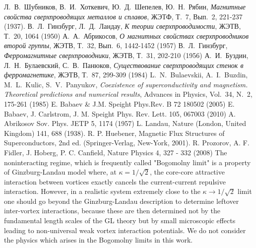 \def\bibname{СПИСОК ИСПОЛЬЗОВАННЫХ ИСТОЧНИКОВ}
\begin{thebibliography}{99}
	\newcommand{\tabfix}{\hspace*{1.25cm}}
	 Л.~В.~Шубников, В.~И.~Хоткевич, Ю.~Д.~Шепелев, 
        Ю.~Н.~Рябин, \textit{Магнитные свойства сверхпроводящих металлов и 
        сплавов}, ЖЭТФ, Т.~7, Вып.~2, 221-237 (1937).
     В.~Л.~Гинзбург, Л.~Д.~Ландау, \textit{К теории 
        сверхпроводимости}, ЖЭТВ, Т.~20, 1064 (1950)
     А.~А.~Абрикосов, \textit{О магнитных свойствах 
        сверхпроводников второй группы}, ЖЭТВ, Т.~32, Вып.~6, 1442-1452 (1957)
     В.~Л.~Гинзбург, \textit{Ферромагнитные 
        сверхпроводники}, ЖЭТВ, Т.~31, 202-210 (1956)
     А.~И.~Буздин, Л.~Н.~Булаевский, С.~В.~Панюков, 
        \textit{Существование сверхпроводящих стенок в ферромагнетике}, 
        ЖЭТВ, Т.~87, 299-309 (1984)
     L.~N.~Bulaevskii, A.~I.~Buzdin, M.~L.~Kulic, 
        S.~V.~Panyukov, \textit{Coexistence of superconductivity and 
        magnetism. Theoretical predictions and numerical results}, Advances in 
        Physics, Vol.~34, N.~2, 175-261 (1985)
     E. Babaev \& J.M. Speight Phys.Rev. B 72 180502 (2005)
     E. Babaev, J. Carlstrom, J. M. Speight Phys. Rev. Lett. 
        105, 067003 (2010)
     A. Abrikosov Sov. Phys. JETP 5, 1174 (1957)
     L. Landau, Nature (London, United Kingdom) 141, 688 
        (1938). R. P. Huebener, Magnetic Flux Structures of Superconductors, 
        2nd ed. (Springer-Verlag, New-York, 2001). R. Prozorov, A. F. Fidler, 
        J. Hoberg, P. C. Canfield, Nature Physics 4, 327 - 332 (2008)
     The noninteracting regime, which is frequently called 
        "Bogomolny limit" is a property of Ginzburg-Landau model where, at 
        \( \kappa = 1/\sqrt{2} \), the core-core attractive interaction 
        between vortices exactly cancels the current-current repulsive 
        interaction. However, in a realistic system extremely close to the 
        \( \kappa \to 1/\sqrt{2} \) limit one should go beyond the 
        Ginzburg-Landau description to determine leftover inter-vortex 
        interactions, because these are then determined not by the fundamental 
        length scales of the GL theory but by small microscopic effects 
        leading to non-universal weak vortex interaction potentials. We do not 
        consider the physics which arises in the Bogomolny limits in this work.

\end{thebibliography}
